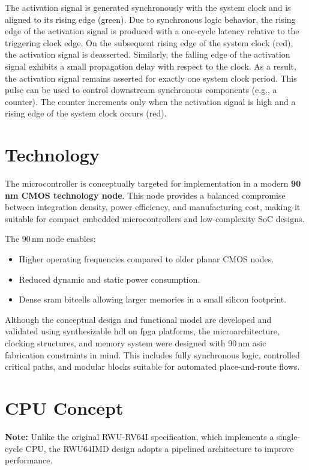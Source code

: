 The activation signal is generated synchronously with the system clock and is aligned to its rising edge (green). Due to synchronous logic behavior, the rising edge of the activation signal is produced with a one-cycle latency relative to the triggering clock edge.
On the subsequent rising edge of the system clock (red), the activation signal is deasserted. Similarly, the falling edge of the activation signal exhibits a small propagation delay with respect to the clock.
As a result, the activation signal remains asserted for exactly one system clock period. This pulse can be used to control downstream synchronous components (e.g., a counter). The counter increments only when the activation signal is high and a rising edge of the system clock occurs (red).


\section{Technology}

The microcontroller is conceptually targeted for implementation in a modern
\textbf{90\,nm CMOS technology node}. This node provides a balanced compromise
between integration density, power efficiency, and manufacturing cost, making
it suitable for compact embedded microcontrollers and low-complexity \gls{SoC}
designs.

The 90\,nm node enables:
\begin{itemize}
      \item Higher operating frequencies compared to older planar CMOS nodes.
      \item Reduced dynamic and static power consumption.
      \item Dense \gls{sram} bitcells allowing larger memories in a small silicon
            footprint.
\end{itemize}

Although the conceptual design and functional model are developed and validated
using synthesizable \gls{hdl} on \gls{fpga} platforms, the microarchitecture,
clocking structures, and memory system were designed with 90\,nm \gls{asic}
fabrication constraints in mind. This includes fully synchronous logic,
controlled critical paths, and modular blocks suitable for automated
place-and-route flows.


\section{CPU Concept} 

\textbf{Note:} Unlike the original RWU-RV64I specification, which implements a
single-cycle CPU, the RWU64IMD design adopts a pipelined architecture to improve
performance.

